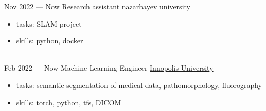\documentclass[letterpaper]{twentysecondcv} %
\begin{document}
\begin{twenty} %
        \twentyitem
        {Nov 2022 —}
        {Now}
        {Research assistant}
        {\href{https://issai.nu.edu.kz/}{nazarbayev university}}
        {}
        {
        {\begin{itemize}
            \item tasks: SLAM project
            \item skills: python, docker
        \end{itemize}}
        }
        \\
        \twentyitem
        {Feb 2022 —}
        {Now}
        {Machine Learning Engineer}
        {\href{https://https://innopolis.university/en/}{Innopolis University}}
        {}
        {
        {\begin{itemize}
            \item tasks: semantic segmentation of medical data, pathomorphology, fluorography
            \item skills: torch, python, tfs, DICOM
        \end{itemize}}
        }
        \\


\end{twenty}
\end{document}
